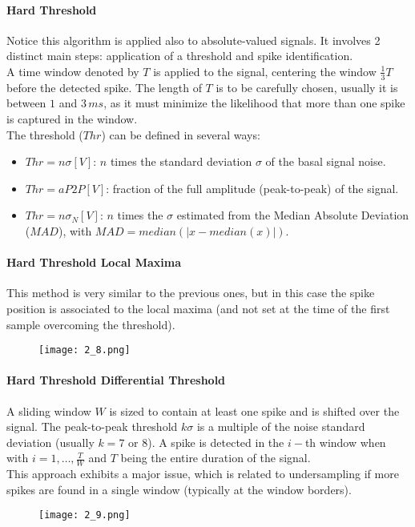 \paragraph{Hard Threshold} Notice this algorithm is applied also to absolute-valued
signals. It involves 2 distinct main steps: application of a threshold and spike identification.\\
A time window denoted by \(T\) is applied to the signal, centering the window \(\frac{1}{3}T\) before the detected spike.
The length of \(T\) is to be carefully chosen, usually it is between \(1\) and \(3\,ms\), as it must minimize the likelihood
that more than one spike is captured in the window.\\
The threshold (\(Thr\)) can be defined in several ways:
\begin{itemize}
    \item \(Thr=n\sigma[V]\): \(n\) times the standard deviation \(\sigma\) of the basal signal noise.
    \item \(Thr=aP2P[V]\): fraction of the full amplitude (peak-to-peak) of the signal.
    \item \(Thr=n\sigma_N[V]\): \(n\) times the \(\sigma\) estimated from the
          Median Absolute Deviation (\(MAD\)), with \(MAD=median(|x-median(x)|)\).
\end{itemize}
\paragraph{Hard Threshold Local Maxima}
This method is very similar to the previous ones, but in this case the spike position is
associated to the local maxima (and not set at the time of the first sample overcoming the threshold).
\begin{figure}[H]
    \centering
    \texttt{[image: 2\_8.png]}
\end{figure}
\paragraph{Hard Threshold Differential Threshold}
A sliding window \(W\) is sized to contain at least one spike and is shifted over the signal.
The peak-to-peak threshold \(k\sigma\) is a multiple of the noise standard deviation (usually \(k=7\) or \(8\)).
A spike is detected in the \(i-\)th window when
\begin{equation*}
    [(max_i-min_i)\ge{k\sigma}]
\end{equation*}
with \(i=1,\dots,\frac{T}{W}\) and \(T\) being the entire duration of the signal.\\
This approach exhibits a major issue, which is related to undersampling if more spikes are found
in a single window (typically at the window borders).
\begin{figure}[H]
    \centering
    \texttt{[image: 2\_9.png]}
\end{figure}
